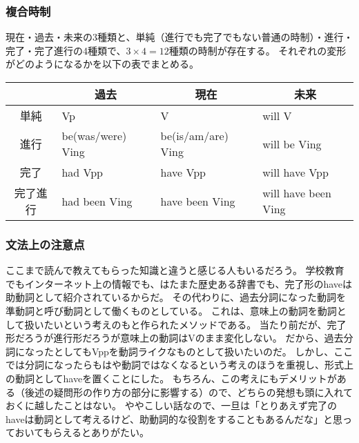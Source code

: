 \subsubsection{複合時制}

現在・過去・未来の3種類と、単純（進行でも完了でもない普通の時制）・進行・完了・完了進行の4種類で、$3 \times 4 = 12$種類の時制が存在する。
それぞれの変形がどのようになるかを以下の表でまとめる。

\begin{table}[h]
  \centering
  \begin{tabular}{clll}
    \hline
     & \multicolumn{1}{c}{過去} & \multicolumn{1}{c}{現在} & \multicolumn{1}{c}{未来}\\
    \hline \hline
    単純 & Vp & V & will V\\
    進行 & be(was/were) Ving & be(is/am/are) Ving & will be Ving\\
    完了 & had Vpp & have Vpp & will have Vpp\\
    完了進行 & had been Ving & have been Ving & will have been Ving\\
    \hline
  \end{tabular}
\end{table}

\subsubsection{文法上の注意点}

ここまで読んで教えてもらった知識と違うと感じる人もいるだろう。
学校教育でもインターネット上の情報でも、はたまた歴史ある辞書でも、完了形のhaveは助動詞として紹介されているからだ。
その代わりに、過去分詞になった動詞を準動詞と呼び動詞として働くものとしている。
これは、意味上の動詞を動詞として扱いたいという考えのもと作られたメソッドである。
当たり前だが、完了形だろうが進行形だろうが意味上の動詞はVのまま変化しない。
だから、過去分詞になったとしてもVppを動詞ライクなものとして扱いたいのだ。
しかし、ここでは分詞になったらもはや動詞ではなくなるという考えのほうを重視し、形式上の動詞としてhaveを置くことにした。
もちろん、この考えにもデメリットがある（後述の疑問形の作り方の部分に影響する）ので、どちらの発想も頭に入れておくに越したことはない。
ややこしい話なので、一旦は「とりあえず完了のhaveは動詞として考えるけど、助動詞的な役割をすることもあるんだな」と思っておいてもらえるとありがたい。



